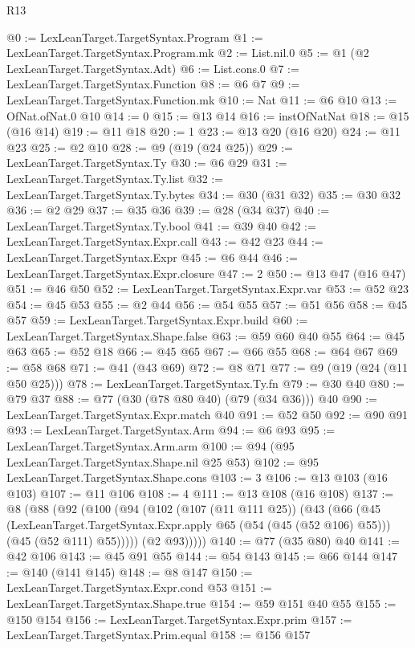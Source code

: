 \begin{lexlean}{R13}
\begin{coremodule}
@0 := LexLeanTarget.TargetSyntax.Program
@1 := LexLeanTarget.TargetSyntax.Program.mk
@2 := List.nil.{0}
@5 := @1 (@2 LexLeanTarget.TargetSyntax.Adt)
@6 := List.cons.{0}
@7 := LexLeanTarget.TargetSyntax.Function
@8 := @6 @7
@9 := LexLeanTarget.TargetSyntax.Function.mk
@10 := Nat
@11 := @6 @10
@13 := OfNat.ofNat.{0} @10
@14 := 0
@15 := @13 @14
@16 := instOfNatNat
@18 := @15 (@16 @14)
@19 := @11 @18
@20 := 1
@23 := @13 @20 (@16 @20)
@24 := @11 @23
@25 := @2 @10
@28 := @9 (@19 (@24 @25))
@29 := LexLeanTarget.TargetSyntax.Ty
@30 := @6 @29
@31 := LexLeanTarget.TargetSyntax.Ty.list
@32 := LexLeanTarget.TargetSyntax.Ty.bytes
@34 := @30 (@31 @32)
@35 := @30 @32
@36 := @2 @29
@37 := @35 @36
@39 := @28 (@34 @37)
@40 := LexLeanTarget.TargetSyntax.Ty.bool
@41 := @39 @40
@42 := LexLeanTarget.TargetSyntax.Expr.call
@43 := @42 @23
@44 := LexLeanTarget.TargetSyntax.Expr
@45 := @6 @44
@46 := LexLeanTarget.TargetSyntax.Expr.closure
@47 := 2
@50 := @13 @47 (@16 @47)
@51 := @46 @50
@52 := LexLeanTarget.TargetSyntax.Expr.var
@53 := @52 @23
@54 := @45 @53
@55 := @2 @44
@56 := @54 @55
@57 := @51 @56
@58 := @45 @57
@59 := LexLeanTarget.TargetSyntax.Expr.build
@60 := LexLeanTarget.TargetSyntax.Shape.false
@63 := @59 @60 @40 @55
@64 := @45 @63
@65 := @52 @18
@66 := @45 @65
@67 := @66 @55
@68 := @64 @67
@69 := @58 @68
@71 := @41 (@43 @69)
@72 := @8 @71
@77 := @9 (@19 (@24 (@11 @50 @25)))
@78 := LexLeanTarget.TargetSyntax.Ty.fn
@79 := @30 @40
@80 := @79 @37
@88 := @77 (@30 (@78 @80 @40) (@79 (@34 @36))) @40
@90 := LexLeanTarget.TargetSyntax.Expr.match @40
@91 := @52 @50
@92 := @90 @91
@93 := LexLeanTarget.TargetSyntax.Arm
@94 := @6 @93
@95 := LexLeanTarget.TargetSyntax.Arm.arm
@100 := @94 (@95 LexLeanTarget.TargetSyntax.Shape.nil @25 @53)
@102 := @95 LexLeanTarget.TargetSyntax.Shape.cons
@103 := 3
@106 := @13 @103 (@16 @103)
@107 := @11 @106
@108 := 4
@111 := @13 @108 (@16 @108)
@137 := @8
    (@88
      (@92
        (@100
          (@94
            (@102
              (@107 (@11 @111 @25))
              (@43
                (@66
                  (@45
                    (LexLeanTarget.TargetSyntax.Expr.apply @65 (@54 (@45 (@52 @106) @55)))
                    (@45 (@52 @111) @55)))))
            (@2 @93)))))
@140 := @77 (@35 @80) @40
@141 := @42 @106
@143 := @45 @91 @55
@144 := @54 @143
@145 := @66 @144
@147 := @140 (@141 @145)
@148 := @8 @147
@150 := LexLeanTarget.TargetSyntax.Expr.cond @53
@151 := LexLeanTarget.TargetSyntax.Shape.true
@154 := @59 @151 @40 @55
@155 := @150 @154
@156 := LexLeanTarget.TargetSyntax.Expr.prim
@157 := LexLeanTarget.TargetSyntax.Prim.equal
@158 := @156 @157

\end{coremodule}
\end{lexlean}
